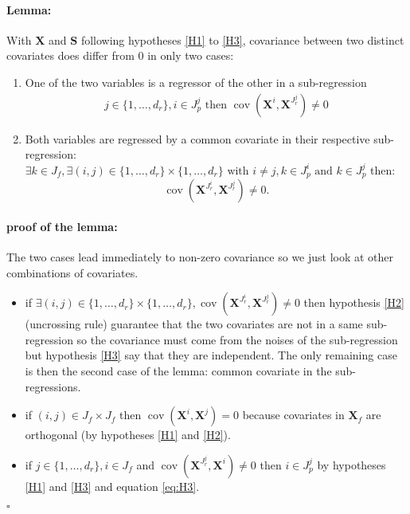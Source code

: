 \documentclass[12pt,a4paper]{report}
\begin{document}
\begin{appendices}
\paragraph{Lemma:} With $\boldsymbol{X}$ and $\boldsymbol{S}$ following hypotheses \ref{H1} to \ref{H3}, covariance between two distinct covariates does differ from $0$ in only two cases:
\begin{enumerate}
	\item One of the two variables is a regressor of the other in a sub-regression	
	\begin{eqnarray}
		j \in \{1,\dots,d_r\}, i \in J_p^j \textrm{ then } \operatorname{cov}(\boldsymbol{X}^{i},\boldsymbol{X}^{J_r^j})\neq 0
	\end{eqnarray}
	\item Both variables are regressed by a common covariate in their respective sub-regression:
$\exists k \in J_f, \exists (i,j)\in \{1,\dots,d_r\}\times \{1,\dots,d_r\} \textrm{ with } i\neq j, k\in J_p^i \textrm{ and } k\in J_p^j$ then:
	\begin{equation}
	\operatorname{cov}(\boldsymbol{X}^{J_r^i},\boldsymbol{X}^{J_r^j})\neq 0. \nonumber 
	\end{equation}
\end{enumerate}

\paragraph{proof of the lemma:}
The two cases lead immediately to non-zero covariance so we just look at other combinations of covariates.
\begin{itemize}
	\item if $\exists (i,j)\in \{1,\dots,d_r\}\times \{1,\dots,d_r\}, \operatorname{cov}(\boldsymbol{X}^{J_r^i},\boldsymbol{X}^{J_r^j})\neq 0$ then hypothesis \ref{H2} (uncrossing rule) guarantee that the two covariates are not in a same sub-regression so the covariance must come from the noises of the sub-regression but hypothesis \ref{H3} say that they are independent. The only remaining case is then the second case of the lemma: common covariate in the sub-regressions.
	\item if $(i,j)\in J_f\times J_f$ then  $\operatorname{cov}(\boldsymbol{X}^i,\boldsymbol{X}^j)=0 $ because covariates in $\boldsymbol{X}_f$ are orthogonal (by hypotheses \ref{H1} and \ref{H2}).
	\item if $j \in \{1,\dots,d_r\}, i \in J_f$ and $\operatorname{cov}(\boldsymbol{X}^{J_r^j},\boldsymbol{X}^i)\neq 0$ then $i\in J_p^j$ by hypotheses \ref{H1} and \ref{H3} and equation \ref{eq:H3}.
\end{itemize}
\hfill $\square$


\end{appendices}
\end{document}
